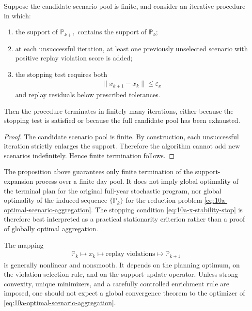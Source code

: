 \begin{proposition}
Suppose the candidate scenario pool is finite, and consider an iterative procedure in which:
\begin{enumerate}
  \item the support of \(\mathbb{P}_{k+1}\) contains the support of \(\mathbb{P}_k\);
  \item at each unsuccessful iteration, at least one previously unselected scenario with positive replay violation score is added;
  \item the stopping test requires both
  \begin{align}
  \|x_{k+1}-x_k\| \le \varepsilon_x
  \label{eq:10a-x-stability-stop}
  \end{align}
  and replay residuals below prescribed tolerances.
\end{enumerate}
Then the procedure terminates in finitely many iterations, either because the stopping test is satisfied or because the full candidate pool has been exhausted.
\end{proposition}

\begin{proof}
The candidate scenario pool is finite. By construction, each unsuccessful iteration strictly enlarges the support. Therefore the algorithm cannot add new scenarios indefinitely. Hence finite termination follows.
\end{proof}

\begin{remark}
The proposition above guarantees only finite termination of the support-expansion process over a finite day pool. It does not imply global optimality of the terminal plan for the original full-year stochastic program, nor global optimality of the induced sequence \(\{\mathbb{P}_k\}\) for the reduction problem \eqref{eq:10a-optimal-scenario-aggregation}. The stopping condition \eqref{eq:10a-x-stability-stop} is therefore best interpreted as a practical stationarity criterion rather than a proof of globally optimal aggregation.
\end{remark}

\begin{remark}
The mapping
\begin{align}
\mathbb{P}_k \mapsto x_k \mapsto \text{replay violations} \mapsto \mathbb{P}_{k+1}
\end{align}
is generally nonlinear and nonsmooth. It depends on the planning optimum, on the violation-selection rule, and on the support-update operator. Unless strong convexity, unique minimizers, and a carefully controlled enrichment rule are imposed, one should not expect a global convergence theorem to the optimizer of \eqref{eq:10a-optimal-scenario-aggregation}.
\end{remark}

